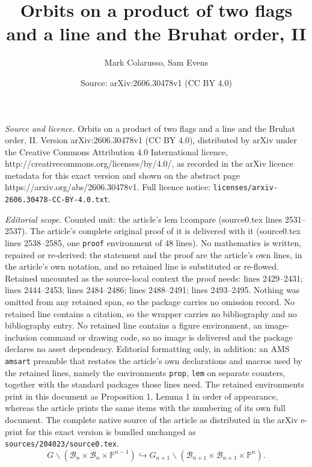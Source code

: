 \documentclass[10pt,a4paper]{amsart}
\title{Orbits on a product of two flags and a line and the Bruhat order, II}
\author{Mark Colarusso, Sam Evens}
\date{Source: arXiv:2606.30478v1 (CC BY 4.0)}
\newcommand{\B}{\mathcal{B}}
\begin{document}
\maketitle

\noindent\emph{Source and licence.} Orbits on a product of two flags and a line and the Bruhat order, II. Version arXiv:2606.30478v1 (CC BY 4.0), distributed by arXiv under the Creative Commons Attribution 4.0 International licence, http://creativecommons.org/licenses/by/4.0/, as recorded in the arXiv licence metadata for this exact version and shown on the abstract page https://arxiv.org/abs/2606.30478v1. Full licence notice: \texttt{licenses/arxiv-2606.30478-CC-BY-4.0.txt}.\par\smallskip

\noindent\textit{Editorial scope.} Counted unit: the article's lem l:compare (source0.tex lines 2531--2537). The article's complete original proof of it is delivered with it (source0.tex lines 2538--2585, one \texttt{proof} environment of 48 lines). No mathematics is written, repaired or re-derived: the statement and the proof are the article's own lines, in the article's own notation, and no retained line is substituted or re-flowed.  Retained uncounted as the source-local context the proof needs: lines 2429--2431; lines 2444--2453; lines 2484--2486; lines 2488--2491; lines 2493--2495.  Nothing was omitted from any retained span, so the package carries no omission record.  No retained line contains a citation, so the wrapper carries no bibliography and no bibliography entry.  No retained line contains a figure environment, an image-inclusion command or drawing code, so no image is delivered and the package declares no asset dependency.  Editorial formatting only, in addition: an AMS \texttt{amsart} preamble that restates the article's own declarations and macros used by the retained lines, namely the environments \texttt{prop}, \texttt{lem} on separate counters, together with the standard packages those lines need.  The retained environments print in this document as Proposition 1, Lemma 1 in order of appearance, whereas the article prints the same items with the numbering of its own full document.  The complete native source of the article as distributed in the arXiv e-print for this exact version is bundled unchanged as \texttt{sources/204023/source0.tex}.
\begin{equation}\label{eq:orbitsembedding}
G\backslash (\B_{n}\times\B_{n}\times \mathbb{P}^{n-1})\hookrightarrow G_{n+1}\backslash (\B_{n+1}\times\B_{n+1}\times \mathbb{P}^{n}).
\end{equation}
\end{document}
